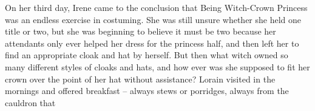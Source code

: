 \documentclass[../FGP.tex]{subfiles}
\begin{document}
\begin{fragment}








\end{fragment}
\begin{fragment}
On her third day, Irene came to the conclusion that Being Witch-Crown Princess was an endless exercise in costuming. She was still unsure whether she held one title or two, but she was beginning to believe it must be two because her attendants only ever helped her dress for the princess half, and then left her to find an appropriate cloak and hat by herself. But then what witch owned so many different styles of cloaks and hats, and how ever was she supposed to fit her crown over the point of her hat without assistance? Lorain visited in the mornings and offered breakfast -- always stews or porridges, always from the cauldron that 
\end{fragment}
\end{document}
